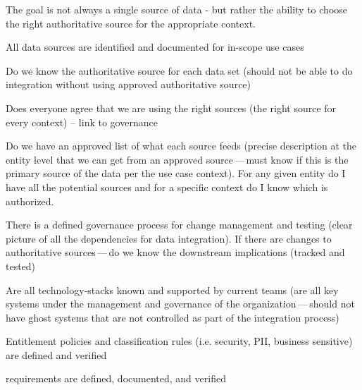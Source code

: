 \kgmmcorequestionssection

The goal is not always a single source of data - but rather the ability to choose the right authoritative source
for the appropriate context.

\kgmmscoringsection

\kgmmscoringlevelOne

\begin{scoring}

    \item All data sources are identified and documented for in-scope use cases
    \item Do we know the authoritative source for each data set (should not be able to do integration without
          using approved authoritative source)
    \item Does everyone agree that we are using the right sources (the right source for every context) --
          link to governance
    \item Do we have an approved list of what each source feeds (precise description at the entity level that
          we can get from an approved source\,---\,must know if this is the primary source of the data per the
          use case context).
          For any given entity do I have all the potential sources and for a specific context do I know which
          is authorized.
    \item There is a defined governance process for change management and testing (clear picture of all the
          dependencies for data integration).
          If there are changes to authoritative sources\,---\,do we know the downstream implications (tracked and tested)
    \item Are all \glspl{technology-stack} known and supported by current teams (are all key systems under the
          management and governance of the organization\,---\,should not have ghost systems that are not controlled
          as part of the integration process)
    \item Entitlement policies and classification rules (i.e. security, PII, business sensitive) are
          defined and verified
    \item {} requirements are defined, documented, and verified

\end{scoring}

\kgmmscoringlevelTwo

